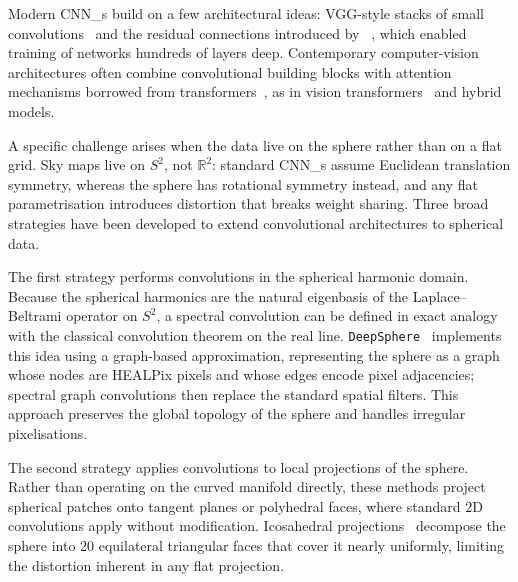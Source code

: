 Modern \glspl{CNN_} build on a few architectural ideas: VGG-style stacks of small convolutions~\cite{Simonyan:2014cmh} and the residual connections introduced by \ResNet~\cite{he2015deep}, which enabled training of networks hundreds of layers deep.
Contemporary computer-vision architectures often combine convolutional building blocks with attention mechanisms borrowed from transformers~\cite{vaswani2023}, as in vision transformers~\cite{Dosovitskiy:2020qjv} and hybrid models.

A specific challenge arises when the data live on the sphere rather than on a flat grid.
Sky maps live on $S^2$, not $\mathbb{R}^2$: standard \glspl{CNN_} assume Euclidean translation symmetry, whereas the sphere has rotational symmetry instead, and any flat parametrisation introduces distortion that breaks weight sharing.
Three broad strategies have been developed to extend convolutional architectures to spherical data.

The first strategy performs convolutions in the spherical harmonic domain.
Because the spherical harmonics are the natural eigenbasis of the Laplace--Beltrami operator on $S^2$, a spectral convolution can be defined in exact analogy with the classical convolution theorem on the real line.
\texttt{DeepSphere}~\cite{DBLP:journals/corr/abs-2012-15000} implements this idea using a graph-based approximation, representing the sphere as a graph whose nodes are HEALPix pixels and whose edges encode pixel adjacencies; spectral graph convolutions then replace the standard spatial filters.
This approach preserves the global topology of the sphere and handles irregular pixelisations.

The second strategy applies convolutions to local projections of the sphere.
Rather than operating on the curved manifold directly, these methods project spherical patches onto tangent planes or polyhedral faces, where standard 2D convolutions apply without modification.
Icosahedral projections~\cite{eder2019convolutions} decompose the sphere into 20 equilateral triangular faces that cover it nearly uniformly, limiting the distortion inherent in any flat projection.

